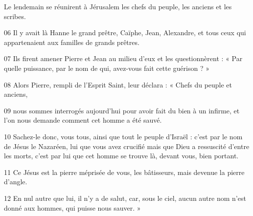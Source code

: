 Le lendemain se réunirent à Jérusalem les chefs du peuple, les anciens et les scribes.

06 Il y avait là Hanne le grand prêtre, Caïphe, Jean, Alexandre, et tous ceux qui appartenaient aux familles de grands prêtres.

07 Ils firent amener Pierre et Jean au milieu d’eux et les questionnèrent : « Par quelle puissance, par le nom de qui, avez-vous fait cette guérison ? »

08 Alors Pierre, rempli de l’Esprit Saint, leur déclara : « Chefs du peuple et anciens,

09 nous sommes interrogés aujourd’hui pour avoir fait du bien à un infirme, et l’on nous demande comment cet homme a été sauvé.

10 Sachez-le donc, vous tous, ainsi que tout le peuple d’Israël : c’est par le nom de Jésus le Nazaréen, lui que vous avez crucifié mais que Dieu a ressuscité d’entre les morts, c’est par lui que cet homme se trouve là, devant vous, bien portant.

11 Ce Jésus est la pierre méprisée de vous, les bâtisseurs, mais devenue la pierre d’angle.

12 En nul autre que lui, il n’y a de salut, car, sous le ciel, aucun autre nom n’est donné aux hommes, qui puisse nous sauver. »